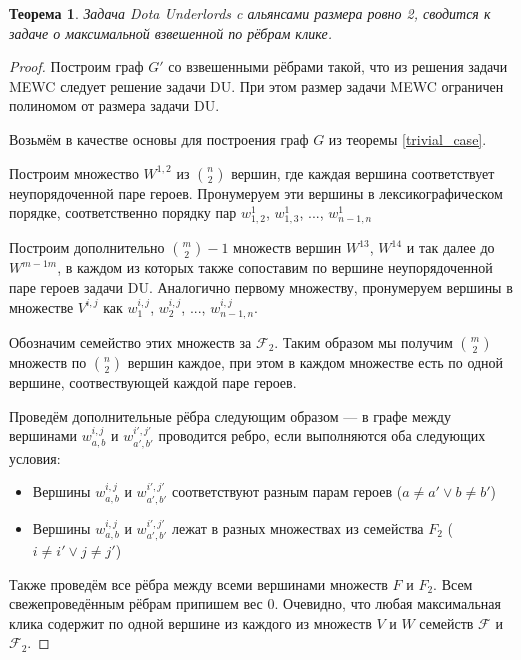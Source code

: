 \documentclass{article}
\newtheorem{theorem}{Теорема}
\begin{document}
\begin{theorem}
\label{second_case}
    Задача Dota Underlords c альянсами размера ровно 2, сводится к задаче о максимальной взвешенной по рёбрам клике.
\end{theorem}

\begin{proof}
    Построим граф $G'$ со взвешенными рёбрами такой, что из решения задачи MEWC следует решение задачи DU. При этом размер задачи MEWC ограничен полиномом от размера задачи DU.
    
    Возьмём в качестве основы для построения граф $G$ из теоремы \ref{trivial_case}.
    
    Построим множество $W^{1,2}$ из $\binom{n}{2}$ вершин, где каждая вершина соответствует неупорядоченной паре героев. Пронумеруем эти вершины в лексикографическом порядке, соответственно порядку пар $w_{1,2}^1$, $w_{1,3}^1$, ..., $w_{n-1,n}^1$
    
    Построим дополнительно $\binom{m}{2}-1$ множеств вершин $W^{13}$, $W^{14}$ и так далее до $W^{m-1 m}$, в каждом из которых также сопоставим по вершине неупорядоченной паре героев задачи DU. Аналогично первому множеству, пронумеруем вершины в множестве $V^{i,j}$ как $w_1^{i,j}$, $w_2^{i,j}$, ..., $w_{n-1,n}^{i,j}$.
    
    Обозначим семейство этих множеств за $\mathcal{F}_2$. Таким образом мы получим $\binom{m}{2}$ множеств по $\binom{n}{2}$ вершин каждое, при этом в каждом множестве есть по одной вершине, соотвествующей каждой паре героев.
    
    Проведём дополнительные рёбра следующим образом --- в графе между вершинами $w_{a,b}^{i,j}$ и $w_{a',b'}^{i',j'}$ проводится ребро, если выполняются оба следующих условия:
    \begin{itemize}
        \item Вершины $w_{a,b}^{i,j}$ и $w_{a',b'}^{i', j'}$ соответствуют разным парам героев ($a \neq a' \lor b \neq b'$)
        \item Вершины $w_{a,b}^{i,j}$ и $w_{a',b'}^{i', j'}$ лежат в разных множествах из семейства $F_2$ ($i \neq i' \lor j \neq j'$)
    \end{itemize}
    
    Также проведём все рёбра между всеми вершинами множеств $F$ и $F_2$. Всем свежепроведённым рёбрам припишем вес 0. Очевидно, что любая максимальная клика содержит по одной вершине из каждого из множеств $V$ и $W$ семейств $\mathcal{F}$ и $\mathcal{F}_2$. 
    

\end{proof}
\end{document}
